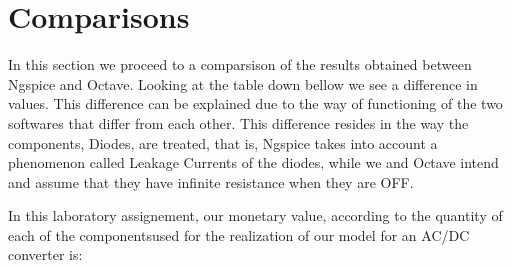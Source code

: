 \section{Comparisons}
\label{sec:comparsisons}

In this section we proceed to a comparsison of the results obtained between Ngspice and Octave. Looking at the table down bellow we see a difference in values. This difference can be explained due to the way of functioning of the two softwares that differ from each other. This difference resides in the way the components, Diodes, are treated, that is, Ngspice takes into account a phenomenon called Leakage Currents of the diodes, while we and Octave intend and assume that they have infinite resistance when they are OFF. 


In this laboratory assignement, our monetary value, according to the quantity of each of the componentsused for the realization of our model for an AC/DC converter is: 


